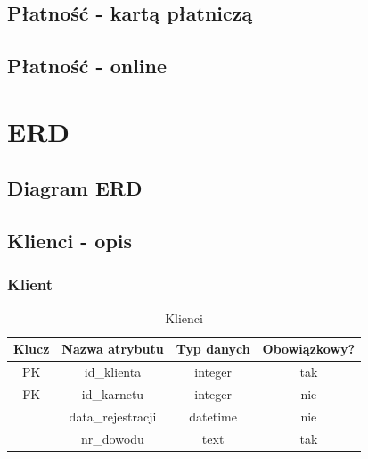 \documentclass{sprawozdanie-agh}
\begin{document}
\begin{landscape}
	\newpage
	\subsection{Płatność - kartą płatniczą}
	\begin{figure}
		
	\end{figure}

	\newpage
	\subsection{Płatność - online}
	\begin{figure}
		
	\end{figure}

\end{landscape}
\newpage
\section{ERD}
\subsection{Diagram ERD}
\begin{figure}
	
\end{figure}

\newpage

\subsection{Klienci - opis}
\subsubsection{Klient}
\begin{table}[H]
	\centering
	\begin{tabular}{|c|c|c|c|}
		\hline
		Klucz & Nazwa atrybutu    & Typ danych & Obowiązkowy? \\ \hline
		PK    & id\_klienta       & integer    & tak           \\ \hline
		FK    & id\_karnetu       & integer    & nie           \\ \hline
		      & data\_rejestracji & datetime   & nie           \\ \hline
		      & nr\_dowodu        & text       & tak           \\ \hline
	\end{tabular}
	\caption{Klienci}
\end{table}
\end{document}
